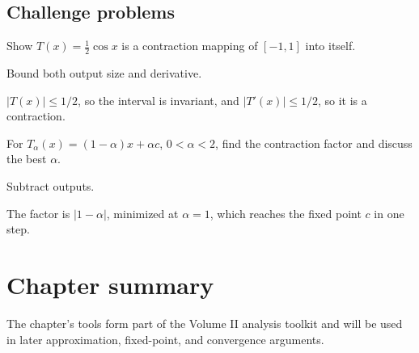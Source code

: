 \subsection*{Challenge problems}

\begin{exercise}\label{exr:ii16-expand-15}
Show \(T(x)=\frac12\cos x\) is a contraction mapping of \([-1,1]\) into itself.
\end{exercise}
\begin{hint}
Bound both output size and derivative.
\end{hint}
\begin{solution}
\(|T(x)|\le1/2\), so the interval is invariant, and \(|T'(x)|\le1/2\), so it is a contraction.
\end{solution}

\begin{exercise}\label{exr:ii16-expand-16}
For \(T_\alpha(x)=(1-\alpha)x+\alpha c\), \(0<\alpha<2\), find the contraction factor and discuss the best \(\alpha\).
\end{exercise}
\begin{hint}
Subtract outputs.
\end{hint}
\begin{solution}
The factor is \(|1-\alpha|\), minimized at \(\alpha=1\), which reaches the fixed point \(c\) in one step.
\end{solution}
\section*{Chapter summary}
The chapter's tools form part of the Volume II analysis toolkit and will be used in later approximation, fixed-point, and convergence arguments.
